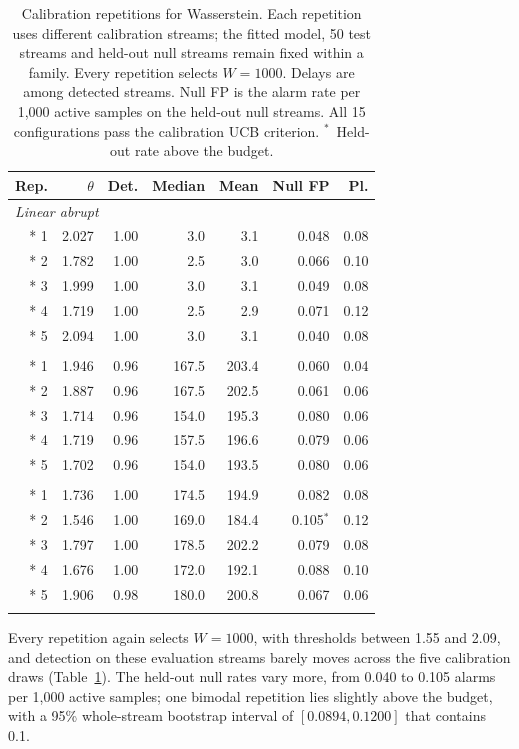 \documentclass[preprint,12pt]{elsarticle}
\begin{document}
\begin{table}[htbp]\centering\small
\caption{Calibration repetitions for Wasserstein. Each repetition uses different calibration streams; the fitted model, 50 test streams and held-out null streams remain fixed within a family. Every repetition selects $W=1000$. Delays are among detected streams. Null FP is the alarm rate per 1,000 active samples on the held-out null streams. All 15 configurations pass the calibration UCB criterion. $^\ast$~Held-out rate above the budget.}\label{tab:robust}
\setlength{\tabcolsep}{4pt}\begin{tabular}{rrrrrrr}
\toprule
Rep. & $\theta$ & Det. & Median & Mean & Null FP & Pl.\\\midrule
\multicolumn{7}{l}{\textit{Linear abrupt}}\\*
1 & 2.027 & 1.00 & 3.0 & 3.1 & 0.048 & 0.08\\*
2 & 1.782 & 1.00 & 2.5 & 3.0 & 0.066 & 0.10\\*
3 & 1.999 & 1.00 & 3.0 & 3.1 & 0.049 & 0.08\\*
4 & 1.719 & 1.00 & 2.5 & 2.9 & 0.071 & 0.12\\*
5 & 2.094 & 1.00 & 3.0 & 3.1 & 0.040 & 0.08\\
\addlinespace
\multicolumn{7}{l}{\textit{River Friedman (LEA)}}\\*
1 & 1.946 & 0.96 & 167.5 & 203.4 & 0.060 & 0.04\\*
2 & 1.887 & 0.96 & 167.5 & 202.5 & 0.061 & 0.06\\*
3 & 1.714 & 0.96 & 154.0 & 195.3 & 0.080 & 0.06\\*
4 & 1.719 & 0.96 & 157.5 & 196.6 & 0.079 & 0.06\\*
5 & 1.702 & 0.96 & 154.0 & 193.5 & 0.080 & 0.06\\
\addlinespace
\multicolumn{7}{l}{\textit{Bimodal shift}}\\*
1 & 1.736 & 1.00 & 174.5 & 194.9 & 0.082 & 0.08\\*
2 & 1.546 & 1.00 & 169.0 & 184.4 & 0.105$^\ast$ & 0.12\\*
3 & 1.797 & 1.00 & 178.5 & 202.2 & 0.079 & 0.08\\*
4 & 1.676 & 1.00 & 172.0 & 192.1 & 0.088 & 0.10\\*
5 & 1.906 & 0.98 & 180.0 & 200.8 & 0.067 & 0.06\\
\addlinespace
\bottomrule\end{tabular}\end{table}

Every repetition again selects $W=1000$, with thresholds between 1.55 and 2.09, and detection on these evaluation streams barely moves across the five calibration draws (Table~\ref{tab:robust}). The held-out null rates vary more, from 0.040 to 0.105 alarms per 1,000 active samples; one bimodal repetition lies slightly above the budget, with a 95\% whole-stream bootstrap interval of $[0.0894,0.1200]$ that contains 0.1.
\end{document}
